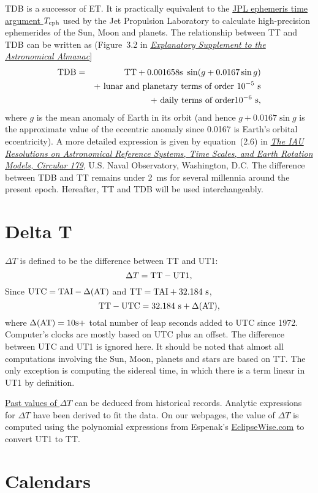 \documentclass[12pt]{article}
\newcommand \beq {\begin{equation}}
\newcommand \eeq {\end{equation}}
\newcommand \beqn {\begin{eqnarray}}
\newcommand \eeqn {\end{eqnarray}}
\newcommand{\expl}{\href{http://www.uscibooks.com/urban.htm}{\it Explanatory Supplement to the Astronomical Almanac}}
\newcommand{\kaplan}{\href{https://arxiv.org/abs/astro-ph/0602086}{\it The IAU Resolutions on Astronomical Reference Systems, Time Scales, and Earth Rotation Models, Circular 179}}
\begin{document}
TDB is a successor of ET. It is practically equivalent to the 
\href{https://en.wikipedia.org/wiki/Ephemeris_time#JPL_ephemeris_time_argument_Teph}{JPL ephemeris time argument $T_{\rm eph}$} 
used by the Jet Propulsion Laboratory to calculate high-precision ephemerides of 
the Sun, Moon and planets. The relationship between TT and TDB 
can be written as (Figure~3.2 in \expl ] 
\beqn
  {\rm TDB} &=& {\rm TT} + 0.001658{\rm s}~\sin(g + 0.0167\sin g) \cr 
&& + \mbox{ lunar and planetary terms of order } 10^{-5}~{\rm s} \cr 
&& + \mbox{ daily terms of order} 10^{-6}~{\rm s} , 
\eeqn
where $g$ is the mean anomaly of Earth in its orbit (and hence $g+0.0167\sin g$ is the 
approximate value of the eccentric anomaly since 0.0167 is Earth's orbital eccentricity). 
A more detailed expression is given by equation~(2.6) in 
\kaplan, U.S. Naval Observatory, Washington, D.C. The difference 
between TDB and TT remains under 2~ms for several millennia around the 
present epoch. Hereafter, TT and TDB will be used interchangeably.

\section{Delta T}
\label{sec:DeltaT}

$\Delta T$ is defined to be the difference between TT and UT1:
\beq
  \Delta T = {\rm TT - UT1} ,
\label{def:DeltaT}
\eeq
Since ${\rm UTC = TAI} - \Delta ({\rm AT})$ and ${\rm TT = TAI + 32.184~s}$, 
\beq
  {\rm TT - UTC = 32.184~s} + \Delta ({\rm AT}) ,
\eeq
where $\Delta ({\rm AT})=10{\rm s}+$ total number of leap seconds added to UTC since 1972. 
Computer's clocks are mostly based on UTC plus an offset.
The difference between UTC and UT1 is ignored here. 
It should be noted that almost all computations involving
the Sun, Moon, planets and stars are based on TT. The only exception is
computing the sidereal time, in which there is a term linear in UT1 by
definition.

\href{http://eclipsewise.com/help/deltat.html}{Past values of $\Delta T$} 
can be deduced from historical records. Analytic expressions for $\Delta T$ 
have been derived to fit the data. On our webpages, the value of 
$\Delta T$ is computed using the polynomial expressions from Espenak's 
\href{http://eclipsewise.com/help/deltatpoly2014.html}{EclipseWise.com} 
to convert UT1 to TT. 

\section{Calendars}
\end{document}
